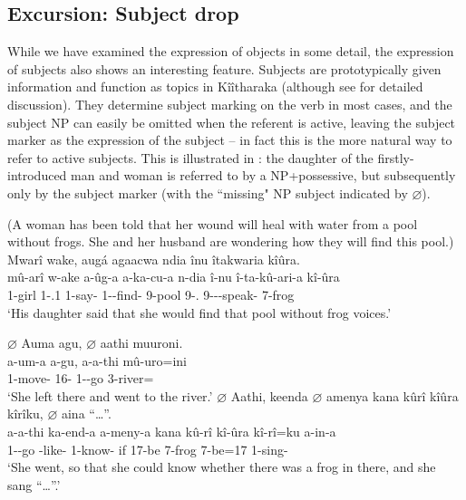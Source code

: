 \documentclass[output=paper]{langscibook}
\begin{document}
\z

\subsection{Excursion: Subject drop}

While {we have examined the expression of objects in some detail, the expression of subjects also shows an interesting feature. Subjects are prototypically given information and function as topics in Kîîtharaka (although see  for detailed discussion). They determine subject marking on the verb in most cases, and the subject NP can easily be omitted when the referent is active, leaving the subject marker as the expression of the subject – in fact this is the more natural way to refer to active subjects. This is illustrated in : the daughter of the firstly-introduced man and woman is referred to by a NP+possessive, but subsequently only by the subject marker (with the ``missing" NP subject indicated by $\varnothing$}).

\ea
\label{bkm:Ref132273993}
(A woman has been told that her wound will heal with water from a pool without frogs. She and her husband are wondering how they will find this pool.)\\
Mwarî wake, augá agaacwa ndia înu îtakwaria kîûra.\\
\gll
mû-arî  w-ake  a-ûg-a  a-ka-cu-a n-dia  î-nu  î-ta-kû-ari-a  kî-ûra \\
1-girl  1-\POSS{}.1 1\SM{}-say-\FV{} 1\SM-\FUT{}-find-\FV{} 9-pool  9-\DEM.\MED{} 9\SM-\NEG-\PRS{}-speak-\FV{} 7-frog \\
\glt
‘His daughter said that she would find that pool without frog voices.’

\sn
$\varnothing$ Auma agu, $\varnothing$ aathi muuroni.\\
\gll
a-um-a  a-gu,  a-a-thi  mû-uro=ini\\
1\SM{}-move-\FV{} 16-\PRO{} 1\SM-\PST{}-go  3-river=\LOC{}\\
\glt
‘She left there and went to the river.’
\pagebreak
\sn
$\varnothing$ Aathi, keenda $\varnothing$ amenya kana kûrî kîûra kîrîku, $\varnothing$ aina “…”.\\
\gll
a-a-thi  ka-end-a  a-meny-a  kana  kû-rî  kî-ûra  kî-rî=ku  a-in-a\\
1\SM-\PST{}-go \FUT{}-like-\FV{} 1\SM{}-know-\FV{} if  17-be  7-frog  7\SM{}-be=17 1\SM{}-sing-\FV{}\\
\glt
‘She went, so that she could know whether there was a frog in there, and she sang “…”.’
\end{document}
